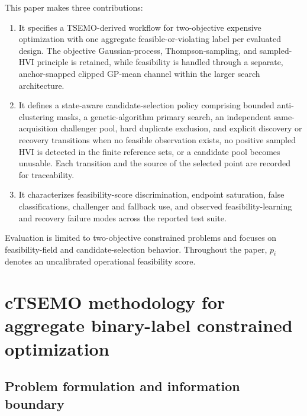 \documentclass[twoside]{article}
\begin{document}
This paper makes three contributions:

\begin{enumerate}
  \item It specifies a TSEMO-derived workflow for two-objective
  expensive optimization with one aggregate feasible-or-violating label per
  evaluated design. The objective Gaussian-process, Thompson-sampling, and
  sampled-HVI principle is retained, while feasibility is handled through a
  separate, anchor-snapped clipped GP-mean channel within the larger search
  architecture.
  \item It defines a state-aware candidate-selection policy comprising bounded
  anti-clustering masks, a genetic-algorithm primary search, an independent
  same-acquisition challenger pool, hard duplicate exclusion, and explicit discovery or recovery
  transitions when no feasible observation exists, no positive sampled HVI is
  detected in the finite reference sets, or a
  candidate pool becomes unusable. Each transition and the source of the
  selected point are recorded for traceability.
  \item It characterizes feasibility-score discrimination, endpoint
  saturation, false classifications, challenger and fallback use, and observed
  feasibility-learning and recovery failure modes across the reported test
  suite.
\end{enumerate}

Evaluation is limited to two-objective constrained problems and focuses on
feasibility-field and candidate-selection behavior. Throughout the paper,
\(p_i\) denotes an uncalibrated operational feasibility score.

\section{cTSEMO methodology for aggregate binary-label constrained optimization}
\label{sec:ctsemo-methodology}

\subsection{Problem formulation and information boundary}
\end{document}
